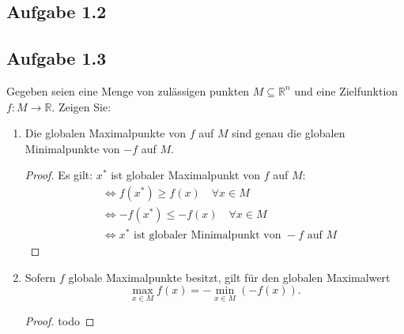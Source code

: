 \documentclass[12pt]{extreport} %
\newcommand{\R}{\mathbb{R}}
\theoremstyle{named}
\theoremstyle{nnamed}
\theoremstyle{itshape}
\theoremstyle{normal}
\begin{document}
\subsection*{Aufgabe 1.2}

\begin{figure*}[h!] \centering
\end{figure*}

\begin{figure*}[h!] \centering
\end{figure*}

\begin{figure*}[h!] \centering
\end{figure*}

\subsection*{Aufgabe 1.3}

Gegeben seien eine Menge von zulässigen punkten $M \subseteq \R^n$ und eine Zielfunktion $f \colon M \rightarrow \R$. Zeigen Sie: 

\begin{enumerate}
	\item Die globalen Maximalpunkte von $f$ auf $M$ sind genau die globalen Minimalpunkte von $-f$ auf $M$.
		\begin{proof}
			Es gilt: $x^*$ ist globaler Maximalpunkt von $f$ auf $M$:
			\begin{align*}
				& \iff f(x^*) \geq f(x) \quad \forall x \in M \\ 
				& \iff - f(x^*) \leq -f(x) \quad \forall x \in M \\
				& \iff x^* \text{ ist globaler Minimalpunkt von } -f \text{ auf } M
			\end{align*}
		\end{proof}
	\item Sofern $f$ globale Maximalpunkte besitzt, gilt für den globalen Maximalwert
	$$ \max_{x \in M} f(x) = - \min_{x \in M} \left( - f(x) \right). $$
		\begin{proof}
		todo
		\end{proof}
\end{enumerate}
\end{document}

